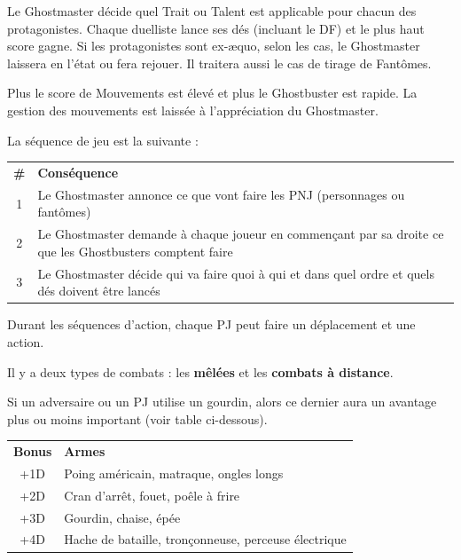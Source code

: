\begin{frame}[b]
{\begin{minipage}[c][0.95\textheight][c]{\linewidth}
\end{minipage}
}
{
\begin{minipage}[c][0.95\textheight][c]{\linewidth}
\myindent Le Ghostmaster décide quel Trait ou Talent est applicable pour chacun des protagonistes. Chaque duelliste lance ses dés (incluant le DF) et le plus haut score gagne. Si les protagonistes sont ex-æquo, selon les cas, le Ghostmaster laissera en l'état ou fera rejouer. Il traitera aussi le cas de tirage de Fantômes.


\myindent Plus le score de Mouvements est élevé et plus le Ghostbuster est rapide. La gestion des mouvements est laissée à l'appréciation du Ghostmaster.


\myindent La séquence de jeu est la suivante :

\begin{center}
\begin{tabular}{c p{7.5cm}}
\textbf{\#} & \textbf{Conséquence}\\
1 & Le Ghostmaster annonce ce que vont faire les PNJ (personnages ou fantômes) \\
2 & Le Ghostmaster demande à chaque joueur en commençant par sa droite ce que les Ghostbusters comptent faire \\
3 & Le Ghostmaster décide qui va faire quoi à qui et dans quel ordre et quels dés doivent être lancés \\
\end{tabular}
\end{center}

\myindent Durant les séquences d'action, chaque PJ peut faire un déplacement et une action.

\myindent Il y a deux types de combats : les \textbf{mêlées} et les \textbf{combats à distance}.


 Si un adversaire ou un PJ utilise un gourdin, alors ce dernier aura un avantage plus ou moins important (voir table ci-dessous).

\begin{center}
\begin{tabular}{c p{6.5cm}}
\textbf{Bonus} & \textbf{Armes}\\
+1D & Poing américain, matraque, ongles longs \\
+2D & Cran d'arrêt, fouet, poêle à frire \\
+3D & Gourdin, chaise, épée \\
+4D & Hache de bataille, tronçonneuse, perceuse électrique \\
\end{tabular}
\end{center}


\end{minipage}}
\end{frame}
